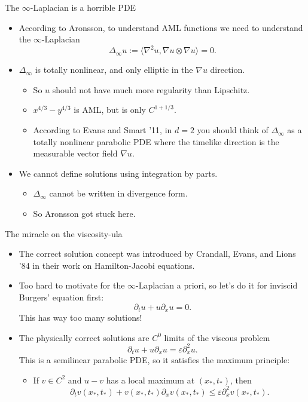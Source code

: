 \documentclass[10pt]{beamer}
\begin{document}
\begin{frame}{The $\infty$-Laplacian is a horrible PDE}
\begin{itemize}
\item According to Aronsson, to understand AML functions we need to understand the $\infty$-Laplacian 
$$\Delta_\infty u := \langle \nabla^2 u, \nabla u \otimes \nabla u\rangle = 0.$$
\item $\Delta_\infty$ is totally nonlinear, and only elliptic in the $\nabla u$ direction. \pause 
\begin{itemize}
\item So $u$ should not have much more regularity than Lipschitz. \pause
\item $x^{4/3} - y^{4/3}$ is AML, but is only $C^{1 + 1/3}$. \pause
\item According to Evans and Smart '11, in $d = 2$ you should think of $\Delta_\infty$ as a totally nonlinear parabolic PDE where the timelike direction is the measurable vector field $\nabla u$. \pause
\end{itemize}
\item We cannot define solutions using integration by parts. \pause
\begin{itemize}
\item $\Delta_\infty$ cannot be written in divergence form. \pause
\item So Aronsson got stuck here.
\end{itemize}
\end{itemize}
\end{frame}

\begin{frame}{The miracle on the viscosity-ula}
\begin{itemize}
\item The correct solution concept was introduced by Crandall, Evans, and Lions '84 in their work on Hamilton-Jacobi equations. \pause
\item Too hard to motivate for the $\infty$-Laplacian a priori, so let's do it for inviscid Burgers' equation first:
$$\partial_t u + u \partial_x u = 0.$$
This has way too many solutions! \pause 
\item The physically correct solutions are $C^0$ limits of the viscous problem 
$$\partial_t u + u \partial_x u = \varepsilon \partial_x^2 u.$$
This is a semilinear parabolic PDE, so it satisfies the maximum principle: \pause
\begin{itemize}
\item If $v \in C^2$ and $u - v$ has a local maximum at $(x_*, t_*)$, then
$$\partial_t v(x_*, t_*) + v(x_*, t_*) \partial_x v(x_*, t_*) \leq \varepsilon \partial_x^2 v(x_*, t_*).$$
\end{itemize}
\end{itemize}
\end{frame}
\end{document}
